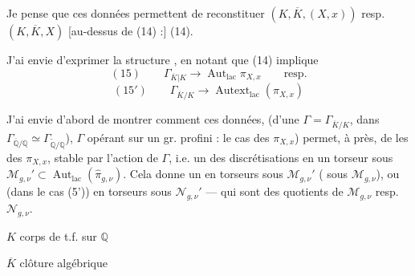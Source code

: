 \documentclass[11pt,a4paper]{article}
\begin{document}



Je pense que ces données permettent de reconstituer $(K,\overline{K},(X,x))$ resp. $(K,\overline{K},X)$  [au-dessus de (14) :] (14).

J'ai envie d'exprimer la structure \ill{} , en notant que (14)  implique
\[
(15)\qquad \Gamma_{\overline{K}|K} \longrightarrow \operatorname{Aut}_{\mathrm{lac}} \pi_{X,x} \qquad \text{resp.}
\]
\[
(15')\qquad \Gamma_{\overline{K}/K} \longrightarrow \operatorname{Autext}_{\mathrm{lac}}(\pi_{X,x})
\]

J'ai envie d'abord de montrer comment ces données,  (d'une \ill{} $\Gamma = \Gamma_{\overline{K}/K}$,  \add{\ill{}} dans $\Gamma_{\overline{\mathbb{Q}}/\mathbb{Q}} \simeq \Gamma_{\widetilde{\mathbb{Q}}/\mathbb{Q}}$), $\Gamma$ opérant sur un gr. profini : le cas des $\pi_{X,x}$) permet, à \ill{} près, de  les \ill{}   \ill{} des \ill{}  $\pi_{X,x}$,   stable par l'action de $\Gamma$, i.e. un \ill{} des discrétisations \ill{} \ill{} en un torseur sous $\mathcal{M}_{g,\nu}' \subset \operatorname{Aut}_{\mathrm{lac}}(\hat{\pi}_{g,\nu})$. Cela donne \ill{} un \ill{} en torseurs sous $\mathcal{M}_{g,\nu}'$ ( sous $\mathcal{M}_{g,\nu}$), ou (dans le cas (5')) en torseurs sous $\mathcal{N}_{g,\nu}'$ — qui sont des quotients de $\mathcal{M}_{g,\nu}$ resp. $\mathcal{N}_{g,\nu}$.

$K$ corps de t.f. sur $\mathbb{Q}$

$\overline{K}$ clôture algébrique
\end{document}
